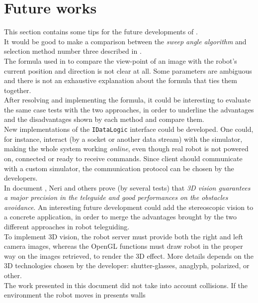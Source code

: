 \setcounter{figure}{0}
\setcounter{table}{0}
\setcounter{lstlisting}{0}

\chapter{Future works}
\label{future_works}
\minitoc

This section contains some tips for the future developments of 
\framework{}.
\\
It would be good to make a comparison between the \textit{sweep angle
algorithm} and selection method number three described in \cite{sugimoto}.
\\
The formula used in \cite{sugimoto} to compare the view-point of an image with
the robot's current position and direction is not clear at all. Some parameters
are ambiguous and there is not an exhaustive explanation about the formula that
ties them together.
\\
After resolving and implementing the formula, it could be interesting to evaluate
the same case tests with the two approaches, in order to underline the advantages
and the disadvantages shown by each method and compare them.
\\
New implementations of the \texttt{IDataLogic} interface could be 
developed. One could, for instance, interact (by a socket or another 
data stream) with the simulator, making the whole system working \textit{online},
even though real \morduc{} robot is not powered on, connected or ready
to receive commands. Since client should communicate with a custom 
simulator, the communication protocol can be chosen by the developers.
\\
In document \cite{morduc:neri}, Neri and others prove (by several tests) that \textit{3D
vision guarantees a major precision in the teleguide and good performances on the obstacles
avoidance}. An interesting future development could add the stereoscopic vision to a concrete
\framework{} application, in order to merge the advantages brought by the two different
approaches in robot teleguiding.
\\
To implement 3D vision, the robot server must provide both the right and left camera images,
whereas the OpenGL functions must draw robot in the proper way on the images retrieved, to render
the 3D effect. More details depends on the 3D technologies chosen by the developer: shutter-glasses,
anaglyph, polarized, or other.
\\
The work presented in this document did not take into account 
collisions. If the environment the robot moves in presents walls 
